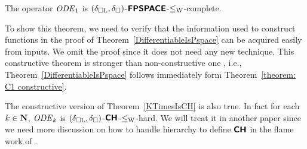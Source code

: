 \begin{theorem}
\label{theorem: C1 constructive}
The operator $\mathit{ODE} _1$ is $(\delta _{\square \mathrm L}, \delta _\square)$-$\text{\bfseries \sffamily \upshape FPSPACE}$-$\leq _{\mathrm W}$-complete.
\end{theorem}

To show this theorem,
we need to verify that the information used to construct functions in the proof of Theorem~\ref{DifferentiableIsPspace}
can be acquired easily from inputs.
We omit the proof since it does not need any new technique.
This constructive theorem is stronger than non-constructive one \cite[補題3.7, 3.8]{kawamura2010operators}, 
i.e., Theorem~\ref{DifferentiableIsPspace} follows immediately
form Theorem~\ref{theorem: C1 constructive}.

The constructive version of Theorem~\ref{KTimesIsCH} is also true.
In fact for each $k \in \mathbf N$,
$\mathit{ODE} _k$ is $(\delta _{\square \mathrm L}, \delta _\square)$-$\text{\bfseries \sffamily \upshape CH}$-$\leq _{\mathrm W}$-hard.
We will treat it in another paper
since we need more discussion on how to handle hierarchy
to define $\text{\bfseries \sffamily \upshape CH}$ in the flame work of \cite{kawamura2010operators}.

